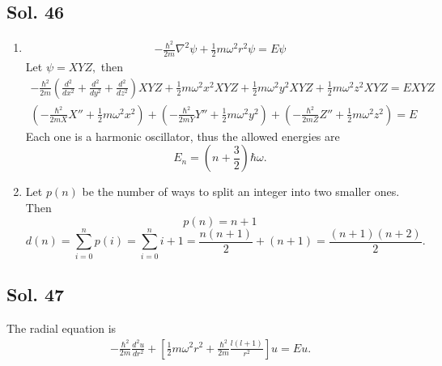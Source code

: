        \subsection*{Sol. 46}
       \begin{enumerate}
           \item 
           \begin{align*}
               -\frac{\hbar^2}{2m}\nabla^2\psi
               +\frac{1}{2}m\omega^2r^2\psi = E\psi
           \end{align*}
           Let $\psi = XYZ,$ then
           \begin{align*}
               -\frac{\hbar^2}{2m}
               (\frac{d^2}{dx^2}+
               \frac{d^2}{dy^2}+
               \frac{d^2}{dz^2})XYZ
               +\frac{1}{2}m\omega^2x^2XYZ
               +\frac{1}{2}m\omega^2y^2XYZ
               +\frac{1}{2}m\omega^2z^2XYZ
               =EXYZ
           \end{align*}
           \begin{align*}
               \left(-\frac{\hbar^2}{2mX}X''+\frac{1}{2}m\omega^2x^2\right)
               +\left(-\frac{\hbar^2}{2mY}Y''+\frac{1}{2}m\omega^2y^2\right)+
               \left(-\frac{\hbar^2}{2mZ}Z''+\frac{1}{2}m\omega^2z^2\right)=E
           \end{align*}
           Each one is a harmonic oscillator, thus the allowed energies are 
           $$
           E_n = \left(n+\frac{3}{2}\right)\hbar\omega.
           $$
           \item 
           Let $p(n)$ be the number of ways to split an integer into two smaller ones. Then 
           $$
           p(n) = n+1
           $$
           $$
           d(n) = \sum_{i=0}^np(i) = 
           \sum_{i=0}^n i+1
           =\frac{n(n+1)}{2}+(n+1)
           =\frac{(n+1)(n+2)}{2}.
           $$
       \end{enumerate}

       \subsection*{Sol. 47}
       The radial equation is 
       \begin{align*}
           -\frac{\hbar^2}{2m}\frac{d^2u}{dr^2} + 
           \left[
           \frac{1}{2}m\omega^2r^2
           +\frac{\hbar^2}{2m}
           \frac{l(l+1)}{r^2}
           \right]u = Eu.
       \end{align*}
       
